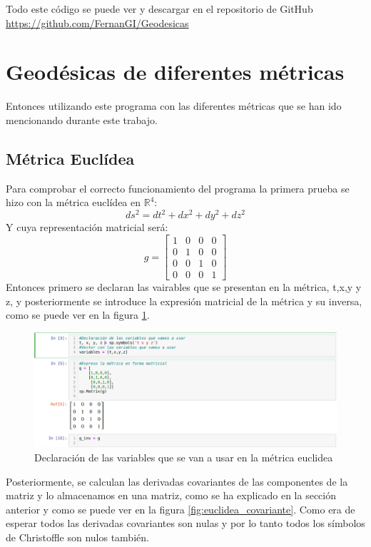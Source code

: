 \documentclass[pdftex,11pt,a4paper]{book}
\begin{document}
Todo este código se puede ver y descargar en el repositorio de GitHub \url{https://github.com/FernanGI/Geodesicas}

\section{Geodésicas de diferentes métricas}
Entonces utilizando este programa con las diferentes métricas que se han ido mencionando durante este trabajo.

\subsection{Métrica Euclídea}
Para  comprobar el correcto funcionamiento del programa la primera prueba se hizo con la métrica euclídea en $\mathbb{R}^4$: 
\begin{equation}
    ds^2= dt^2+dx^2+dy^2+dz^2
\end{equation}
Y cuya representación matricial será: 
\begin{equation}
    g = \left[\begin{array}{llll}
1 & 0 & 0 & 0 \\
0 & 1 & 0 & 0 \\
0 & 0 & 1 & 0 \\
0 & 0 & 0 & 1
\end{array}\right]
\end{equation}
Entonces primero se declaran las vairables que se presentan en la métrica, t,x,y y z, y posteriormente  se introduce la expresión matricial de la métrica y su inversa, como se puede ver en la figura \ref{fig:euclidea_declaracion}.

\begin{figure}[!ht]
    \centering
    \includegraphics[scale = 0.33]{euclidea_declaracion.png}
    \caption{Declaración de las variables que se van a usar en la métrica euclidea }
    \label{fig:euclidea_declaracion}
\end{figure}
\newpage
Posteriormente, se calculan las derivadas covariantes de las componentes de la matriz y lo almacenamos en una matriz, como se ha explicado en la sección anterior y como se puede ver en la figura \ref{fig:euclidea_covariante}. Como era de esperar todos las derivadas covariantes son nulas y por lo tanto todos los símbolos de Christoffle son nulos también. 
\end{document}
